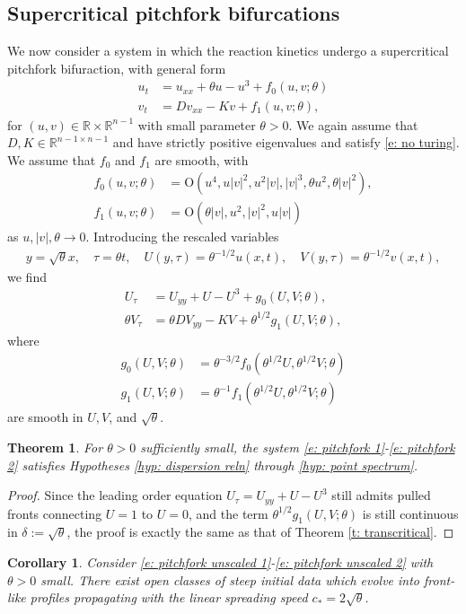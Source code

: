 \documentclass[11pt]{article}
\newcommand{\R}{\mathbb{R}}
\newtheorem{corollary}[prop]{Corollary}
\newtheorem{thmlocal}[prop]{Theorem}
\numberwithin{equation}{section}
\numberwithin{prop}{section}
\begin{document}
\subsection{Supercritical pitchfork bifurcations}
We now consider a system in which the reaction kinetics undergo a supercritical pitchfork bifuraction, with general form
\begin{align}
	u_t &= u_{xx} + \theta u - u^3 + f_0(u, v; \theta) \label{e: pitchfork unscaled 1} \\
	v_t &= D v_{xx} - K v + f_1 (u, v; \theta), \label{e: pitchfork unscaled 2}
\end{align}
for $(u,v) \in \R \times \R^{n-1}$ with small parameter $\theta > 0$. We again assume that $D, K \in \R^{n-1 \times n-1}$ and have strictly positive eigenvalues and satisfy \eqref{e: no turing}. We assume that $f_0$ and $f_1$ are smooth, with
\begin{align}
	f_0 (u, v; \theta) &= \mathrm{O}\left( u^4, u|v|^2, u^2 |v|, |v|^3, \theta u^2, \theta |v|^2 \right), \\
	f_1(u, v; \theta) &= \mathrm{O}\left(\theta |v|, u^2, |v|^2, u|v|\right)
\end{align}
as $u, |v|, \theta \to 0$.
Introducing the rescaled variables
\begin{align}
y = \sqrt{\theta} x, \quad \tau = \theta t, \quad U(y,\tau) = \theta^{-1/2} u(x,t), \quad V(y, \tau) = \theta^{-1/2} v(x,t),
\end{align}
we find
\begin{align}
U_\tau &= U_{yy} + U - U^3 + g_0(U, V; \theta), \label{e: pitchfork 1}\\
\theta V_\tau &= \theta D V_{yy} - K V + \theta^{1/2} g_1 (U, V; \theta) \label{e: pitchfork 2},
\end{align}
where
\begin{align}
g_0 (U, V; \theta) &= \theta^{-3/2} f_0 (\theta^{1/2} U, \theta^{1/2} V; \theta) \\
g_1 (U, V; \theta) &= \theta^{-1} f_1 (\theta^{1/2} U, \theta^{1/2} V; \theta)
\end{align}
are smooth in $U, V$, and $\sqrt{\theta}$.  
\begin{thmlocal}\label{t: pitchfork}
	For $\theta > 0$ sufficiently small, the system \eqref{e: pitchfork 1}-\eqref{e: pitchfork 2} satisfies Hypotheses \ref{hyp: dispersion reln} through \ref{hyp: point spectrum}.
\end{thmlocal}
\begin{proof}
	Since the leading order equation $U_\tau = U_{yy} + U - U^3$ still admits pulled fronts connecting $U = 1$ to $U= 0$, and the term $\theta^{1/2} g_1 (U, V; \theta)$ is still continuous in $\delta := \sqrt{\theta}$, the proof is exactly the same as that of Theorem \ref{t: transcritical}.  
\end{proof}
\begin{corollary}
	Consider \eqref{e: pitchfork unscaled 1}-\eqref{e: pitchfork unscaled 2} with $\theta > 0$ small. There exist open classes of steep initial data which evolve into front-like profiles propagating with the linear spreading speed $c_* = 2 \sqrt{\theta}$. 
\end{corollary}
\end{document}
